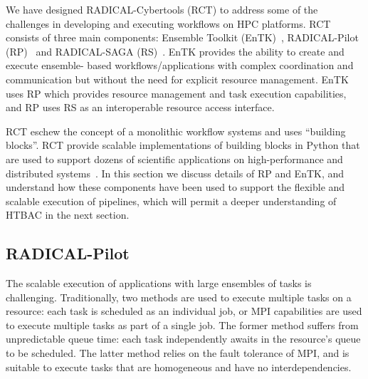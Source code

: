 
We have designed RADICAL-Cybertools (RCT) to address some of the challenges
in developing and executing workflows on HPC platforms. RCT consists of three
main components: Ensemble Toolkit (EnTK)~\cite{balasubramanian2016ensemble},
RADICAL-Pilot (RP)~\cite{merzky2015radical} and RADICAL-SAGA
(RS)~\cite{saga-x}. EnTK provides the ability to create and execute ensemble-
based workflows/applications with complex coordination and communication but
without the need for explicit resource management. EnTK uses RP which
provides resource management and task execution capabilities, and RP uses RS
as an interoperable resource access  interface.

RCT eschew the concept of a monolithic workflow systems and uses ``building
blocks''. RCT provide scalable implementations of building blocks in Python
that are used to support dozens of scientific applications on high-performance
and distributed systems~\cite{turilli2016analysis, angius2017converging,
treikalis2016repex, balasubramanian2016ensemble, balasubramanian2016extasy}. 
In this section we discuss details of RP and EnTK, and understand how these 
components have been used to support the flexible and scalable execution of 
pipelines, which will permit a deeper understanding of HTBAC in the next 
section.




\subsection{RADICAL-Pilot}

The scalable execution of applications with large ensembles of tasks is
challenging. Traditionally, two methods are used to execute multiple tasks on
a resource: each task is scheduled as an individual job, or MPI capabilities
are used to execute multiple tasks as part of a single job. The former method
suffers from unpredictable queue time: each task independently awaits in the
resource's queue to be scheduled. The latter method relies on the fault
tolerance of MPI, and is suitable to execute tasks that are homogeneous and
have no interdependencies.

